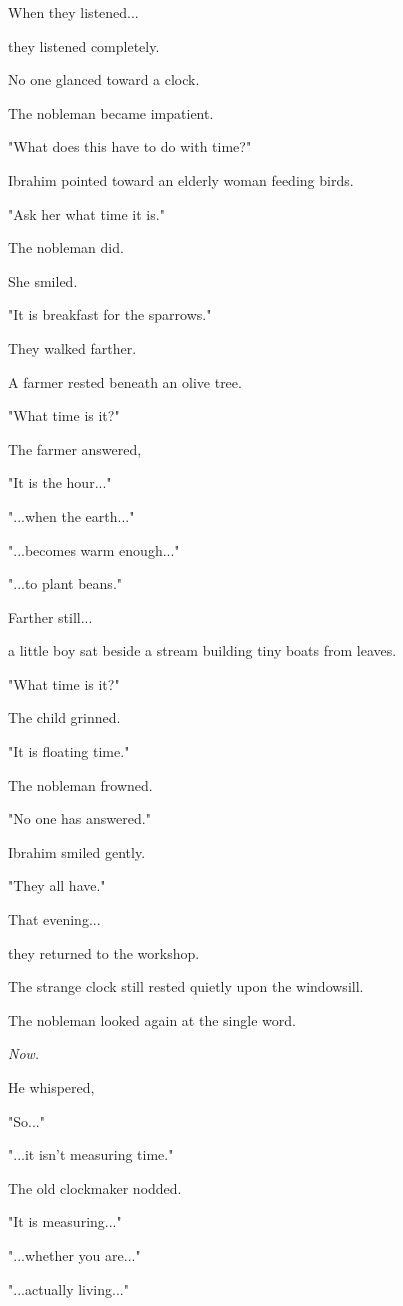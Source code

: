 \documentclass[12pt,openany]{book}
\begin{document}
When they listened...

they listened completely.

No one glanced toward a clock.

The nobleman became impatient.

"What does this have to do with time?"

Ibrahim pointed toward an elderly woman feeding birds.

"Ask her what time it is."

The nobleman did.

She smiled.

"It is breakfast for the sparrows."

They walked farther.

A farmer rested beneath an olive tree.

"What time is it?"

The farmer answered,

"It is the hour..."

"...when the earth..."

"...becomes warm enough..."

"...to plant beans."

Farther still...

a little boy sat beside a stream building tiny boats from leaves.

"What time is it?"

The child grinned.

"It is floating time."

The nobleman frowned.

"No one has answered."

Ibrahim smiled gently.

"They all have."

That evening...

they returned to the workshop.

The strange clock still rested quietly upon the windowsill.

The nobleman looked again at the single word.

\emph{Now.}

He whispered,

"So..."

"...it isn't measuring time."

The old clockmaker nodded.

"It is measuring..."

"...whether you are..."

"...actually living..."
\end{document}
